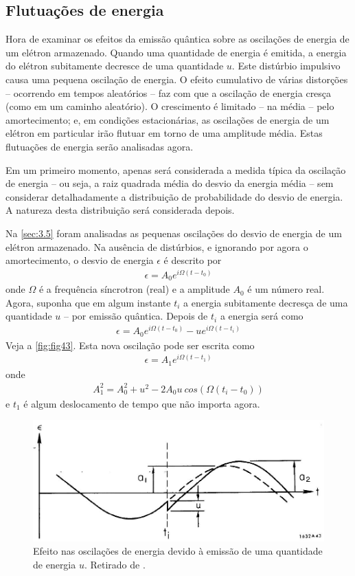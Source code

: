 \subsection{Flutuações de energia}\label{sec:5.2}
Hora de examinar os efeitos da emissão quântica sobre as oscilações de energia de um elétron armazenado. Quando uma quantidade de energia é emitida, a energia do elétron subitamente decresce de uma quantidade $u$. Este distúrbio impulsivo causa uma pequena oscilação de energia. O efeito cumulativo de várias distorções -- ocorrendo em tempos aleatórios -- faz com que a oscilação de energia cresça (como em um caminho aleatório). O crescimento é limitado -- na média -- pelo amortecimento; e, em condições estacionárias, as oscilações de energia de um elétron em particular irão flutuar em torno de uma amplitude média. Estas flutuações de energia serão analisadas agora.

Em um primeiro momento, apenas será considerada a medida típica da oscilação de energia -- ou seja, a raiz quadrada média do desvio da energia média -- sem considerar detalhadamente a distribuição de probabilidade do desvio de energia. A natureza desta distribuição será considerada depois.

Na \autoref{sec:3.5} foram analisadas as pequenas oscilações do desvio de energia de um elétron armazenado. Na ausência de distúrbios, e ignorando por agora o amortecimento, o desvio de energia $\epsilon$ é descrito por
\begin{align}
	\epsilon = A_0 e^{i\Omega(t-t_0)}
\end{align}
onde $\Omega$ é a frequência síncrotron (real) e a amplitude $A_0$ é um número real. Agora, suponha que em algum instante $t_i$ a energia subitamente decresça de uma quantidade $u$ -- por emissão quântica. Depois de $t_i$ a energia será como
\begin{align}
	\epsilon = A_0 e^{i\Omega(t-t_0)} - ue^{i\Omega(t-t_i)}
\end{align}
Veja a \autoref{fig:fig43}. Esta nova oscilação pode ser escrita como
\begin{align}
	\epsilon = A_1e^{i\Omega(t-t_1)}
\end{align}
onde
\begin{align}
	A_1^2 = A_0^2 + u^2 - 2A_0u\ cos(\Omega (t_i-t_0))
\end{align}
e $t_1$ é algum deslocamento de tempo que não importa agora.

\begin{figure}[!htb]
	\centering
	\includegraphics[width=0.9\linewidth]{./Figuras/fig43.jpeg}
	\caption{Efeito nas oscilações de energia devido à emissão de uma quantidade de energia $u$. Retirado de \cite{sands1970physics}.}
	\label{fig:fig43}
\end{figure}

